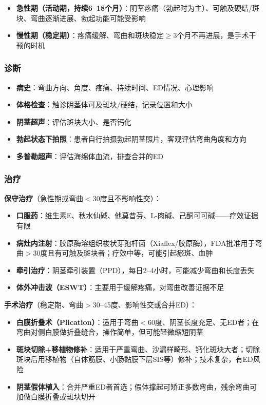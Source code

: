\begin{itemize}[leftmargin=2cm]
	\item \textbf{急性期（活动期，持续6--18个月）}：阴茎疼痛（勃起时为主）、可触及硬结/斑块、弯曲逐渐进展、勃起功能可能受影响
	\item \textbf{慢性期（稳定期）}：疼痛缓解、弯曲和斑块稳定$\ge$3个月不再进展，是手术干预的时机
\end{itemize}

\subsubsection{诊断}

\begin{itemize}[leftmargin=2cm]
	\item \textbf{病史}：弯曲方向、角度、疼痛、持续时间、ED情况、心理影响
	\item \textbf{体格检查}：触诊阴茎体可及斑块/硬结，记录位置和大小
	\item \textbf{阴茎超声}：评估斑块大小、是否钙化
	\item \textbf{勃起状态下拍照}：患者自行拍摄勃起阴茎照片，客观评估弯曲角度和方向
	\item \textbf{多普勒超声}：评估海绵体血流，排查合并的ED
\end{itemize}

\subsubsection{治疗}

\textbf{保守治疗}（急性期或弯曲$<$30度且不影响性交）：
\begin{itemize}[leftmargin=2cm]
	\item \textbf{口服药}：维生素E、秋水仙碱、他莫昔芬、L-肉碱、己酮可可碱——疗效证据有限
	\item \textbf{病灶内注射}：胶原酶溶组织梭状芽孢杆菌（Xiaflex/胶原酶），FDA批准用于弯曲$>$30度且有可触及斑块者；疗效中等，可能引起瘀斑、血肿
	\item \textbf{牵引治疗}：阴茎牵引装置（PPD），每日2--4小时，可能减少弯曲和长度丢失
	\item \textbf{体外冲击波（ESWT）}：主要用于缓解疼痛，对弯曲改善证据不足
\end{itemize}

\textbf{手术治疗}（稳定期、弯曲$>$30--45度、影响性交或合并ED）：
\begin{itemize}[leftmargin=2cm]
	\item \textbf{白膜折叠术（Plication）}：适用于弯曲$<$60度、阴茎长度充足、无ED者；在弯曲对侧白膜做折叠缝合，操作简单，但可能轻微缩短阴茎
	\item \textbf{斑块切除+移植物修补}：适用于严重弯曲、沙漏样畸形、钙化斑块大者；切除斑块后用移植物（自体筋膜、小肠黏膜下层SIS等）修补；技术复杂，有ED风险
	\item \textbf{阴茎假体植入}：合并严重ED者首选；假体撑起可矫正多数弯曲，残余弯曲可加做白膜折叠或斑块切开
\end{itemize}

